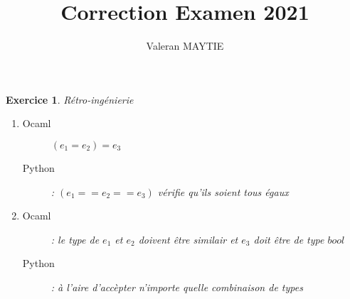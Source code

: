 \documentclass{article}
\title{Correction Examen 2021}
\author{Valeran MAYTIE}
\date{}
\theoremstyle{plain}
\newtheorem{exo}{Exercice}%
\begin{document}
\maketitle

\begin{exo} Rétro-ingénierie
\begin{enumerate}
  \item \begin{description}
      \item[Ocaml]$(e_1 = e_2) = e_3$

      \item[Python]: $(e_1 == e_2 == e_3)$ vérifie qu'ils soient tous égaux
  \end{description}

  \item \begin{description}
    \item[Ocaml]: le type de $e_1$ et  $e_2$ doivent être similair 
      et $e_3$ doit être de type $bool$

    \item[Python]: à l'aire d'accèpter n'importe 
      quelle combinaison de types
  \end{description}
\end{enumerate}
\end{exo}
\end{document}
